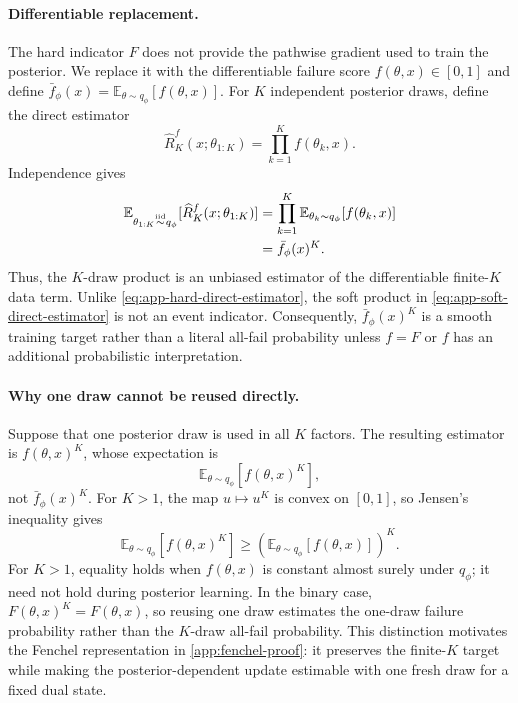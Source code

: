 \paragraph{Differentiable replacement.}
The hard indicator $F$ does not provide the pathwise gradient used to train the posterior.
We replace it with the differentiable failure score $f(\theta,x)\in[0,1]$ and define $\bar f_\phi(x)=\mathbb E_{\theta\sim q_\phi}[f(\theta,x)]$.
For $K$ independent posterior draws, define the direct estimator
\begin{equation}
  \widehat R_K^{f}(x;\theta_{1:K})
  =
  \prod_{k=1}^K f(\theta_k,x).
  \label{eq:app-soft-direct-estimator}
\end{equation}
Independence gives
\begin{align}
  \mathbb E_{\theta_{1:K}\overset{\mathrm{iid}}{\sim}q_\phi}
  [\widehat R_K^{f}(x;\theta_{1:K})]
  & =
  \prod_{k=1}^K
  \mathbb E_{\theta_k\sim q_\phi}[f(\theta_k,x)]
  \notag\\
  & =
  \bar f_\phi(x)^K.
  \label{eq:app-soft-finite-k}
\end{align}
Thus, the $K$-draw product is an unbiased estimator of the differentiable finite-$K$ data term.
Unlike \cref{eq:app-hard-direct-estimator}, the soft product in \cref{eq:app-soft-direct-estimator} is not an event indicator.
Consequently, $\bar f_\phi(x)^K$ is a smooth training target rather than a literal all-fail probability unless $f=F$ or $f$ has an additional probabilistic interpretation.

\paragraph{Why one draw cannot be reused directly.}
Suppose that one posterior draw is used in all $K$ factors.
The resulting estimator is $f(\theta,x)^K$, whose expectation is
\begin{equation}
  \mathbb E_{\theta\sim q_\phi}[f(\theta,x)^K],
  \label{eq:app-reused-draw}
\end{equation}
not $\bar f_\phi(x)^K$.
For $K>1$, the map $u\mapsto u^K$ is convex on $[0,1]$, so Jensen's inequality gives
\begin{equation}
  \mathbb E_{\theta\sim q_\phi}[f(\theta,x)^K]
  \geq
  \left(
    \mathbb E_{\theta\sim q_\phi}[f(\theta,x)]
  \right)^K.
  \label{eq:app-reused-draw-jensen}
\end{equation}
For $K>1$, equality holds when $f(\theta,x)$ is constant almost surely under $q_\phi$; it need not hold during posterior learning.
In the binary case, $F(\theta,x)^K=F(\theta,x)$, so reusing one draw estimates the one-draw failure probability rather than the $K$-draw all-fail probability.
This distinction motivates the Fenchel representation in \cref{app:fenchel-proof}: it preserves the finite-$K$ target while making the posterior-dependent update estimable with one fresh draw for a fixed dual state.

